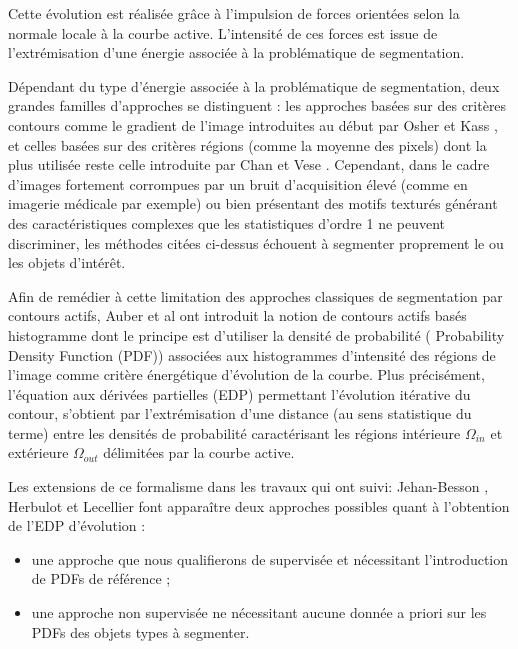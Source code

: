 \documentclass[11pt]{article}
\begin{document}
Cette évolution est réalisée grâce à l’impulsion de forces orientées selon la normale locale à la courbe active. L’intensité de ces forces est issue de l’extrémisation d’une énergie associée à la problématique de segmentation.

Dépendant du type d’énergie associée à la problématique de segmentation, deux grandes familles d’approches se distinguent : les approches basées sur des critères contours comme le gradient de l’image introduites au début par Osher \cite{osher-88} et Kass \cite{snakes-active-contour-models}, et celles basées sur des critères régions (comme la moyenne des pixels) dont la plus utilisée reste celle introduite par Chan et Vese \cite{chan-01}. Cependant, dans le cadre d’images fortement corrompues par un bruit d’acquisition élevé (comme en imagerie médicale par exemple) ou bien présentant des motifs texturés générant des caractéristiques complexes que les statistiques d’ordre 1
ne peuvent discriminer, les méthodes citées ci-dessus échouent à segmenter proprement le ou les objets d’intérêt.

Afin  de  remédier à  cette  limitation des  approches classiques de  segmentation par  contours actifs, Auber et al \cite{Aubert-03} ont introduit la notion de contours actifs basés histogramme dont le principe est d’utiliser la densité de probabilité (
Probability Density Function (PDF)) associées aux histogrammes d’intensité  des régions de  l’image  comme  critère  énergétique d’évolution de  la  courbe. Plus  précisément, l’équation aux dérivées partielles (EDP) permettant l’évolution itérative du contour, s’obtient par l’extrémisation d’une distance (au sens statistique du terme) entre les densités de probabilité caractérisant les régions intérieure
$ \Omega _{in} $ et extérieure $ \Omega _{out} $ délimitées par la courbe active.

Les  extensions  de  ce  formalisme  dans  les  travaux  qui  ont  suivi: Jehan-Besson \cite{Jehan-Besson-03},  Herbulot \cite{Herbulot-2003} et Lecellier \cite{Lecellier-2010} font apparaître deux approches possibles quant à l’obtention de l’EDP d’évolution :
\begin{itemize}
\item une approche que nous qualifierons de supervisée et nécessitant l’introduction de PDFs de référence ;
\item une approche non supervisée ne nécessitant aucune donnée a priori sur les PDFs des objets types à segmenter.
\end{itemize}
\end{document}
